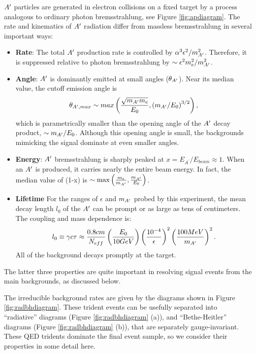 $A^\prime$ particles are generated in electron collisions on a fixed target by a process analogous to ordinary photon bremsstrahlung, see Figure \ref{fig:apdiagram}.  The rate and kinematics of $A^\prime$ radiation differ from massless bremsstrahlung in several important ways:
\begin{itemize}
\item  {\bf Rate}: The total $A^\prime$ production rate is controlled by $\alpha^3\epsilon^2 / m_{A^\prime}^2$.  
 Therefore, it is suppressed relative to photon bremsstrahlung by $\sim \epsilon^2 m_e^2/m_{A^\prime}^2$. 
\item {\bf Angle}:  $A^\prime$  is dominantly  emitted at  small angles ($\theta_{A^\prime}$).  Near its median value, the cutoff emission angle is
\begin{equation}
\theta_{A^\prime,max}\sim max\left(\frac{\sqrt{m_{A^\prime} m_e}}{E_0},\left(m_{A^\prime}/E_0\right)^{3/2}\right),
\end{equation}
which is parametrically smaller than the opening angle of the $A^\prime$ decay product, $\sim  m_{A^\prime}/E_0$.  Although this opening angle is small, the backgrounds mimicking the signal dominate at even smaller angles.
\item {\bf Energy}:  $A^\prime$ bremsstrahlung is sharply peaked at $x=E_{A^\prime}/E_{beam}\approx 1$.  When an $A^\prime$ is produced, it carries nearly the entire beam energy.  In fact, the median value of (1-x) is $\sim {\rm max}\left(\frac{m_e}{m_{A^\prime}},\frac{m_{A^\prime}}{E_0}\right)$.  
\item{\bf Lifetime} For the ranges of $\epsilon$ and $m_{A^\prime}$ probed by this experiment, the mean decay length $l_0$ of the $A^\prime$ can be prompt or as large as tens of centimeters.   The coupling and mass dependence is:
\begin{equation}
l_0 \equiv \gamma c\tau \approx \frac{0.8 cm}{N_{eff}} \left(\frac{E_0}{10 GeV}\right)\left(\frac{10^{-4}}{\epsilon}\right)^2\left(\frac{100 MeV}{m_{A^\prime}}\right)^2.
\end{equation}
All of the background decays promptly at the target.  
\end{itemize}
The  latter three properties are quite important in resolving signal events from the main backgrounds, as discussed
below.   

The irreducible background rates are given by the diagrams shown in Figure \ref{fig:radbhdiagram}. These trident events can be usefully separated into ``radiative'' diagrams (Figure \ref{fig:radbhdiagram} (a)), and ``Bethe-Heitler'' diagrams (Figure \ref{fig:radbhdiagram} (b)), that are separately gauge-invariant.  These QED tridents dominate the final event sample, so we consider their properties in some detail here.

